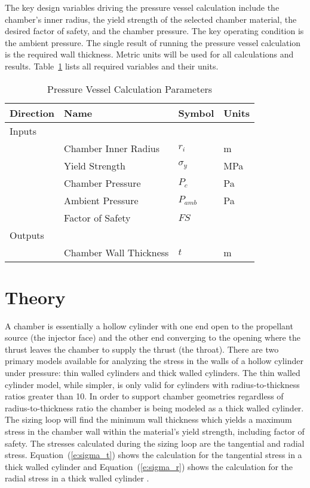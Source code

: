 \documentclass{article}
\begin{document}
The key design variables driving the pressure vessel calculation include the chamber's inner radius, the yield strength of the selected chamber material, the desired factor of safety, and the chamber pressure.  The key operating condition is the ambient pressure.  The single result of running the pressure vessel calculation is the required wall thickness. Metric units will be used for all calculations and results.  Table~\ref{t:parameters} lists all required variables and their units.

\clearpage

\begin{table}[ht!]%
  \caption{Pressure Vessel Calculation Parameters}
  \centering
  \begin{tabular}{llll}
   Direction & Name & Symbol & Units \\
	\hline\hline
     Inputs & & &\\
     	        & Chamber Inner Radius & $r_i$ & m \\
                & Yield Strength & $\sigma_y$ & MPa \\
                & Chamber Pressure & $P_c$ & Pa \\
                & Ambient Pressure & $P_{amb}$ & Pa \\
                & Factor of Safety & $FS$ & \\
      Outputs & & & \\
                & Chamber Wall Thickness & $t$ & m \\
	\hline
  \end{tabular}
 \label{t:parameters}
\end{table}


\section{Theory}
A chamber is essentially a hollow cylinder with one end open to the propellant source (the injector face) and the other end converging to the opening where the thrust leaves the chamber to supply the thrust (the throat).  There are two primary models available for analyzing the stress in the walls of a hollow cylinder under pressure:  thin walled cylinders and thick walled cylinders.  The thin walled cylinder model, while simpler, is only valid for cylinders with radius-to-thickness ratios greater than 10.  In order to support chamber geometries regardless of radius-to-thickness ratio the chamber is being modeled as a thick walled cylinder.  The sizing loop will find the minimum wall thickness which yields a maximum stress in the chamber wall within the material's yield strength, including factor of safety.  The stresses calculated during the sizing loop are the tangential and radial stress.  Equation~(\ref{e:sigma_t}) shows the calculation for the tangential stress in a thick walled cylinder and Equation~(\ref{e:sigma_r}) shows the calculation for the radial stress in a thick walled cylinder \cite{Shigley1989}. 
\end{document}
